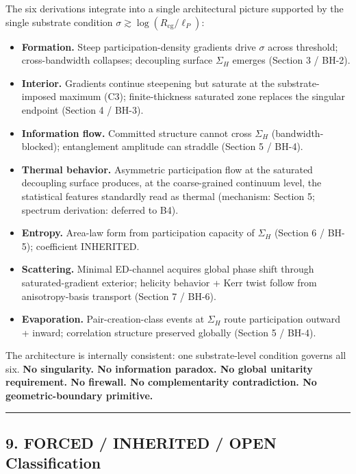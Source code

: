\documentclass[
  11pt,
  a4paper,
]{article}
\providecommand{\tightlist}{%
  \setlength{\itemsep}{0pt}\setlength{\parskip}{0pt}}
\begin{document}
The six derivations integrate into a single architectural picture
supported by the single substrate condition
\(\sigma \gtrsim \log(R_\mathrm{cg}/\ell_P)\):

\begin{itemize}
\tightlist
\item
  \textbf{Formation.} Steep participation-density gradients drive
  \(\sigma\) across threshold; cross-bandwidth collapses; decoupling
  surface \(\Sigma_H\) emerges (Section 3 / BH-2).
\item
  \textbf{Interior.} Gradients continue steepening but saturate at the
  substrate-imposed maximum (C3); finite-thickness saturated zone
  replaces the singular endpoint (Section 4 / BH-3).
\item
  \textbf{Information flow.} Committed structure cannot cross
  \(\Sigma_H\) (bandwidth-blocked); entanglement amplitude can straddle
  (Section 5 / BH-4).
\item
  \textbf{Thermal behavior.} Asymmetric participation flow at the
  saturated decoupling surface produces, at the coarse-grained continuum
  level, the statistical features standardly read as thermal (mechanism:
  Section 5; spectrum derivation: deferred to B4).
\item
  \textbf{Entropy.} Area-law form from participation capacity of
  \(\Sigma_H\) (Section 6 / BH-5); coefficient INHERITED.
\item
  \textbf{Scattering.} Minimal ED-channel acquires global phase shift
  through saturated-gradient exterior; helicity behavior + Kerr twist
  follow from anisotropy-basis transport (Section 7 / BH-6).
\item
  \textbf{Evaporation.} Pair-creation-class events at \(\Sigma_H\) route
  participation outward + inward; correlation structure preserved
  globally (Section 5 / BH-4).
\end{itemize}

The architecture is internally consistent: one substrate-level condition
governs all six. \textbf{No singularity. No information paradox. No
global unitarity requirement. No firewall. No complementarity
contradiction. No geometric-boundary primitive.}

\begin{center}\rule{0.5\linewidth}{0.5pt}\end{center}

\subsection{9. FORCED / INHERITED / OPEN
Classification}\label{forced-inherited-open-classification}
\end{document}
